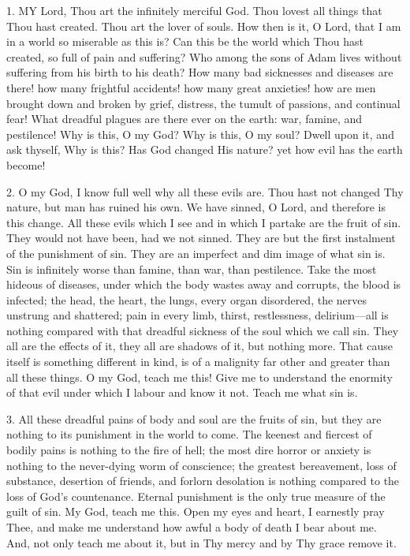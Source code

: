 
1. MY
Lord, Thou art the infinitely merciful God. Thou lovest all things that
Thou hast created. Thou art the lover of souls. How then is it, O Lord,
that I am in a world so miserable as this is? Can this be the world
which Thou hast created, so full of pain and suffering? Who among the
sons of Adam lives without suffering from his birth to his death? How
many bad sicknesses and diseases are there! how many frightful
accidents! how many great anxieties! how are men brought down and broken
by grief, distress, the tumult of passions, and continual fear! What
dreadful plagues are there ever on the earth: war, famine, and
pestilence! Why is this, O my God? Why is this, O my soul? Dwell upon
it, and ask thyself, Why is this? Has God changed His nature? yet how
evil has the earth become!

2. O my God, I know full well
why all these evils are. Thou hast not changed Thy nature, but man has
ruined his own. We have sinned, O Lord, and therefore is this change.
All these evils which I see and in which I partake are the fruit of sin.
They would not have been, had we not sinned. They are but the first
instalment of the punishment of sin. They are an imperfect and dim image
of what sin is. Sin is infinitely worse than famine, than war, than
pestilence. Take the most hideous of diseases, under which the
body wastes away and corrupts, the blood is infected; the head, the
heart, the lungs, every organ disordered, the nerves unstrung and
shattered; pain in every limb, thirst, restlessness, delirium—all is
nothing compared with that dreadful sickness of the soul which we call
sin. They all are the effects of it, they all are shadows of it, but
nothing more. That cause itself is something different in kind, is of a
malignity far other and greater than all these things. O my God, teach
me this! Give me to understand the enormity of that evil under which I
labour and know it not. Teach me what sin is.

3. All these dreadful pains of
body and soul are the fruits of sin, but they are nothing to its
punishment in the world to come. The keenest and fiercest of bodily
pains is nothing to the fire of hell; the most dire horror or anxiety is
nothing to the never-dying worm of conscience; the greatest bereavement,
loss of substance, desertion of friends, and forlorn desolation is
nothing compared to the loss of God's countenance. Eternal punishment is
the only true measure of the guilt of sin. My God, teach me this. Open
my eyes and heart, I earnestly pray Thee, and make me understand how
awful a body of death I bear about me. And, not only teach me about it,
but in Thy mercy and by Thy grace remove it.

